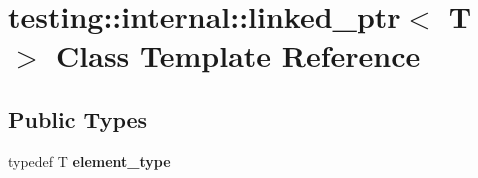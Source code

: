 \hypertarget{classtesting_1_1internal_1_1linked__ptr}{}\section{testing\+:\+:internal\+:\+:linked\+\_\+ptr$<$ T $>$ Class Template Reference}
\label{classtesting_1_1internal_1_1linked__ptr}
\subsection*{Public Types}
\begin{DoxyCompactItemize}
\item 
typedef T {\bfseries element\+\_\+type}\hypertarget{classtesting_1_1internal_1_1linked__ptr_a295c7d1ee4100d916514c4e4385a0063}{}\label{classtesting_1_1internal_1_1linked__ptr_a295c7d1ee4100d916514c4e4385a0063}

\end{DoxyCompactItemize}
